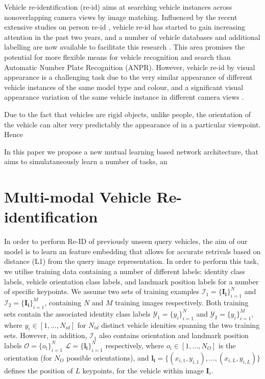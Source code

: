 \documentclass[10pt,twocolumn,letterpaper]{article}
\begin{document}
Vehicle re-identification (re-id) aims at searching vehicle instances across nonoverlapping camera views by image matching. Influenced by the recent extensive studies on person re-id \cite{gong2014re}, vehicle re-id has started to gain increasing attention in the past two years, and a number of vehicle databases and additional labelling are now available to facilitate this research \cite{liu2016vehicleid,liu2016veri,yang2015large,kanaci2018vehicle,wang2017orientation}. This area promises the potential for more flexible means for vehicle recognition and search than Automatic Number Plate Recognition (ANPR). However, vehicle re-id by visual appearance is a
challenging task due to the very similar appearance of different vehicle instances
of the same model type and colour, and a significant visual appearance variation
of the same vehicle instance in different camera views \cite{}.


Due to the fact that vehicles are rigid objects, unlike people, the orientation of the vehicle can alter very predictably the appearance of in a particular viewpoint. Hence

In this paper we propose a new mutual learning based network architecture, that aims to simulataneously learn a number of tasks, an

\section{Multi-modal Vehicle Re-identification}

In order to perform Re-ID of previously unseen query vehicles, the aim of our model is to learn an feature embedding that allows for accurate retrivals based on distance (\eg L1) from the query image representation. In order to perform this task, we utilise training data containing a number of different labels: identity class labels, vehicle orientation class labels, and landmark position labels for a number of specific keypoints. We assume two sets of training examples $\mathcal{I_1} = \{\mathbf{I_i}\}_{i=1}^N$ and $\mathcal{I}_2 = \{\mathbf{I_i}\}_{i=1}^M$, containing $N$ and $M$ training images respectively. Both training sets contain the associated identity class labels $\mathcal{Y}_1=\{y_i\}_{i=1}^N$ and $\mathcal{Y}_2=\{y_i\}_{i=1}^M$, where $y_i \in \left[1,...,N_{id}\right]$ for $N_{id}$ distinct vehicle idenities spanning the two training sets. However, in addition, $\mathcal{I}_1$ also contains orientation and landmark position labels $\mathcal{O}=\{o_i\}_{i=1}^N$ $\mathcal{L}=\{\mathbf{l_i}\}_{i=1}^N$ respectively, where $o_i \in \left[1,...,N_O\right]$ is the orientation (for $N_O$ possible orientations), and  $\mathbf{l_i}=\{\left(x_{i,1},y_{i,1}\right),...,\left(x_{i,L},y_{i,L}\right)\}$ defines the position of $L$ keypoints, for the vehicle within image $\mathbf{I}_i$.
\end{document}

